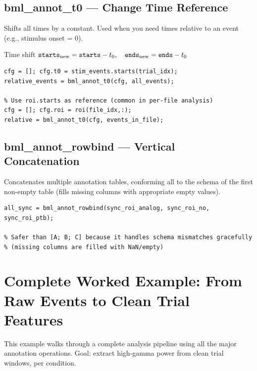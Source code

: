 \documentclass[11pt, a4paper]{article}
\begin{document}
\subsection{bml\_annot\_t0 --- Change Time Reference}

Shifts all times by a constant. Used when you need times relative to an event (e.g., stimulus onset = 0).

\begin{formulabox}{Time shift}
$\texttt{starts}_{\rm new} = \texttt{starts} - t_0,\quad
 \texttt{ends}_{\rm new} = \texttt{ends} - t_0$
\end{formulabox}

\begin{lstlisting}[style=matlab]
% Set stimulus onset as t=0
cfg = []; cfg.t0 = stim_events.starts(trial_idx);
relative_events = bml_annot_t0(cfg, all_events);

% Use roi.starts as reference (common in per-file analysis)
cfg = []; cfg.roi = roi(file_idx,:);
relative = bml_annot_t0(cfg, events_in_file);
\end{lstlisting}

\subsection{bml\_annot\_rowbind --- Vertical Concatenation}

Concatenates multiple annotation tables, conforming all to the schema of the first non-empty table (fills missing columns with appropriate empty values).

\begin{lstlisting}[style=matlab]
% Combine sync results from three methods
all_sync = bml_annot_rowbind(sync_roi_analog, sync_roi_no, sync_roi_ptb);

% Safer than [A; B; C] because it handles schema mismatches gracefully
% (missing columns are filled with NaN/empty)
\end{lstlisting}

\section{Complete Worked Example: From Raw Events to Clean Trial Features}
\label{sec:example}

This example walks through a complete analysis pipeline using all the major annotation operations. Goal: extract high-gamma power from clean trial windows, per condition.
\end{document}
